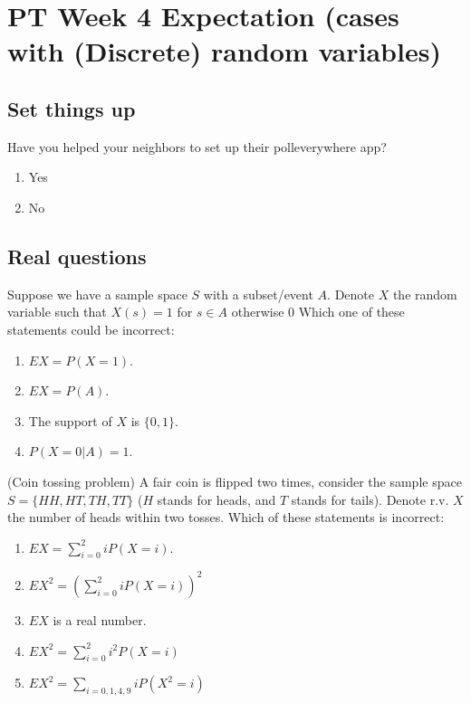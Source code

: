 \documentclass[poll_tutorial_format]{subfiles}
\begin{document}
	\maketitle
	\setcounter{section}{3}
	\section{PT Week 4 Expectation (cases with (Discrete) random variables)}
	
	\subsection{Set things up}
	\label{sec:set-things-up}
	
	
	
	\setcounter{theorem}{-1}
	
	\begin{exercise}
		Have you helped your neighbors to set up their polleverywhere app? 
		\begin{enumerate}
			\item Yes
			\item No
		\end{enumerate}
	\end{exercise}
	
	\subsection{Real questions}
	\label{sec:start-real-questions pt week 4}
	\begin{exercise}
		Suppose we have a sample space $S$ with a subset/event $A$. Denote $X$ the random variable such that $X(s)=1$ for $s\in A$ otherwise $0$ 
		Which one of these statements could be incorrect:
		\begin{enumerate}
			\item $EX=P(X=1)$.
			\item $EX=P(A)$.
			\item The support of $X$ is $\{0,1\}$.
			\item $P(X=0|A)=1$. 
		\end{enumerate}
	\end{exercise}
	
	
	\begin{exercise}
		(Coin tossing problem) A fair coin is flipped two times, consider the sample space $S=\{HH, HT, TH, TT\}$ ($H$ stands for heads, and $T$ stands for tails). Denote r.v. $X$ the number of heads within two tosses.
		Which of these statements is incorrect: 
		\begin{enumerate}
			\item $EX=\sum_{i=0}^2 iP(X=i)$.
			\item $EX^2=\left(\sum_{i=0}^2 iP(X=i) \right)^2$ 
			\item $EX$ is a real number.
			\item $EX^2=\sum_{i=0}^2 i^2P(X=i)$
			\item $EX^2=\sum_{i=0,1,4,9} iP(X^2=i)$
		\end{enumerate}
	\end{exercise}
	
\end{document}
